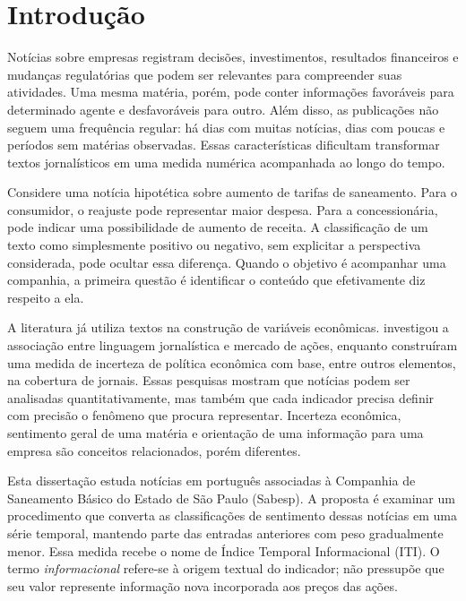 \chapter{Introdução}
\label{cap:introducao}

Notícias sobre empresas registram decisões, investimentos, resultados financeiros e mudanças regulatórias que podem ser relevantes para compreender suas atividades. Uma mesma matéria, porém, pode conter informações favoráveis para determinado agente e desfavoráveis para outro. Além disso, as publicações não seguem uma frequência regular: há dias com muitas notícias, dias com poucas e períodos sem matérias observadas. Essas características dificultam transformar textos jornalísticos em uma medida numérica acompanhada ao longo do tempo.

Considere uma notícia hipotética sobre aumento de tarifas de saneamento. Para o consumidor, o reajuste pode representar maior despesa. Para a concessionária, pode indicar uma possibilidade de aumento de receita. A classificação de um texto como simplesmente positivo ou negativo, sem explicitar a perspectiva considerada, pode ocultar essa diferença. Quando o objetivo é acompanhar uma companhia, a primeira questão é identificar o conteúdo que efetivamente diz respeito a ela.

A literatura já utiliza textos na construção de variáveis econômicas.  investigou a associação entre linguagem jornalística e mercado de ações, enquanto  construíram uma medida de incerteza de política econômica com base, entre outros elementos, na cobertura de jornais. Essas pesquisas mostram que notícias podem ser analisadas quantitativamente, mas também que cada indicador precisa definir com precisão o fenômeno que procura representar. Incerteza econômica, sentimento geral de uma matéria e orientação de uma informação para uma empresa são conceitos relacionados, porém diferentes.

Esta dissertação estuda notícias em português associadas à Companhia de Saneamento Básico do Estado de São Paulo (Sabesp). A proposta é examinar um procedimento que converta as classificações de sentimento dessas notícias em uma série temporal, mantendo parte das entradas anteriores com peso gradualmente menor. Essa medida recebe o nome de Índice Temporal Informacional (ITI). O termo \emph{informacional} refere-se à origem textual do indicador; não pressupõe que seu valor represente informação nova incorporada aos preços das ações.

